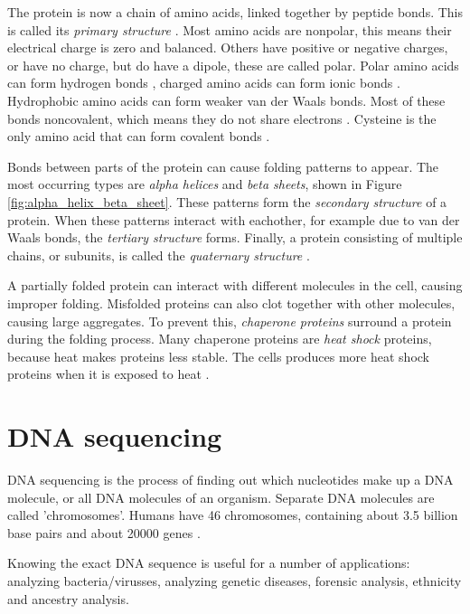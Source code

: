 \documentclass[../main/thesis.tex]{subfiles}
\begin{document}
The protein is now a chain of amino acids, linked together by peptide bonds.
This is called its \textit{primary structure} \cite{protein_structures}.
Most amino acids are nonpolar, this means their electrical charge is zero and balanced.
Others have positive or negative charges, or have no charge, but do have a dipole, these are called polar.
Polar amino acids can form hydrogen bonds \cite{hydrogen_bond}, charged amino acids can form ionic bonds \cite{ionic_bond}.
Hydrophobic amino acids can form weaker van der Waals bonds.
Most of these bonds noncovalent, which means they do not share electrons \cite{ionic_bond}.
Cysteine is the only amino acid that can form covalent bonds \cite{protein_structures}.

Bonds between parts of the protein can cause folding patterns to appear.
The most occurring types are \textit{alpha helices} and \textit{beta sheets}, shown in Figure \ref{fig:alpha_helix_beta_sheet}.
These patterns form the \textit{secondary structure} of a protein.
When these patterns interact with eachother, for example due to van der Waals bonds, the \textit{tertiary structure} forms.
Finally, a protein consisting of multiple chains, or subunits, is called the \textit{quaternary structure} \cite{protein_structures}.


A partially folded protein can interact with different molecules in the cell, causing improper folding.
Misfolded proteins can also clot together with other molecules, causing large aggregates.
To prevent this, \textit{chaperone proteins} surround a protein during the folding process.
Many chaperone proteins are \textit{heat shock} proteins, because heat makes proteins less stable.
The cells produces more heat shock proteins when it is exposed to heat \cite{chaperone_protein}.


\section{DNA sequencing}
DNA sequencing is the process of finding out which nucleotides make up a DNA molecule, or all DNA molecules of an organism.
Separate DNA molecules are called 'chromosomes'.
Humans have 46 chromosomes, containing about 3.5 billion base pairs \cite{DNA_human_stats} and about 20000 genes \cite{human_genes}.

Knowing the exact DNA sequence is useful for a number of applications: analyzing bacteria/virusses, analyzing genetic diseases, forensic analysis, ethnicity and ancestry analysis.
\end{document}
